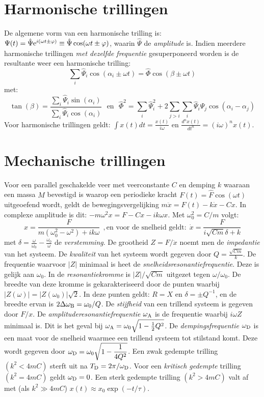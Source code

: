 \section{Harmonische trillingen}
De algemene vorm van een harmonische trilling is:
$\Psi(t)=\hat{\Psi}{\rm e}^{i(\omega t\pm\varphi)}\equiv\hat{\Psi}\cos(\omega t\pm\varphi)$,
\npar
waarin $\hat{\Psi}$ de {\it amplitude} is. Indien meerdere harmonische
trillingen {\it met dezelfde frequentie} gesuperponeerd worden is de
resultante weer een harmonische trilling:
\[
\sum_i \hat{\Psi}_i\cos(\alpha_i\pm\omega t)=\hat{\Phi}\cos(\beta\pm\omega t)
\]
met:
\[
\tan(\beta)=\frac{\sum\limits_i\hat{\Psi}_i\sin(\alpha_i)}{\sum\limits_i\hat{\Psi}_i\cos(\alpha_i)}~~~\mbox{en}~~~
\hat{\Phi}^2=\sum_i\hat{\Psi}^2_i+2\sum_{j>i}\sum_i\hat{\Psi}_i\hat{\Psi}_j\cos(\alpha_i-\alpha_j)
\]
Voor harmonische trillingen geldt:
$\displaystyle\int x(t)dt=\frac{x(t)}{i\omega}$ en
$\displaystyle\frac{d^nx(t)}{dt^n}=(i\omega)^n x(t)$.

\section{Mechanische trillingen}
Voor een parallel geschakelde veer met veerconstante $C$ en demping $k$
waaraan een massa $M$ bevestigd is waarop een periodieke kracht
$F(t)=\hat{F}\cos(\omega t)$ uitgeoefend wordt, geldt de
bewegingsvergelijking $m\ddot{x}=F(t)-k\dot{x}-Cx$. In complexe amplitude is
dit: $-m\omega^2 x=F-Cx-ik\omega x$. Met $\omega_0^2=C/m$ volgt:
\[
x=\frac{F}{m(\omega_0^2-\omega^2)+ik\omega}~~,\mbox{en voor de snelheid geldt:}~~
\dot{x}=\frac{F}{i\sqrt{Cm}\delta+k}
\]
met $\displaystyle\delta=\frac{\omega}{\omega_0}-\frac{\omega_0}{\omega}$ de
{\it verstemming}. De grootheid $Z=F/\dot{x}$ noemt men de {\it impedantie}
van het systeem. De {\it kwaliteit} van het systeem wordt gegeven door
$\displaystyle Q=\frac{\sqrt{Cm}}{k}$.
\npar
De frequentie waarvoor $|Z|$ minimaal is heet de {\it snelheidsresonantiefrequentie}.
Deze is gelijk aan $\omega_0$. In de {\it resonantiekromme} is $|Z|/\sqrt{Cm}$
uitgezet tegen $\omega/\omega_0$. De breedte van deze kromme is gekarakteriseerd
door de punten waarbij $|Z(\omega)|=|Z(\omega_0)|\sqrt{2}$. In deze punten
geldt: $R=X$ en $\delta=\pm Q^{-1}$, en de breedte ervan is
$2\Delta\omega_{\rm B}=\omega_0/Q$.
\npar
De {\it stijfheid} van een trillend systeem is gegeven door $F/x$. De
{\it amplituderesonantiefrequentie} $\omega_{\rm A}$ is de frequentie waarbij
$i\omega Z$ minimaal is. Dit is het geval bij $\omega_{\rm A}=\omega_0\sqrt{1-\mbox{$\frac{1}{2}$} Q^2}$.
\npar
De {\it dempingsfrequentie} $\omega_{\rm D}$ is een maat voor de snelheid
waarmee een trillend systeem tot stilstand komt. Deze wordt gegeven door
$\displaystyle\omega_{\rm D}=\omega_0\sqrt{1-\frac{1}{4Q^2}}$. Een zwak
gedempte trilling $(k^2<4mC)$ sterft uit na $T_{\rm D}=2\pi/\omega_{\rm D}$.
Voor een {\it kritisch gedempte} trilling $(k^2=4mC)$ geldt $\omega_{\rm D}=0$.
Een sterk gedempte trilling $(k^2>4mC)$ valt af met (als $k^2\gg 4mC$)
$x(t)\approx x_0\exp(-t/\tau)$.

